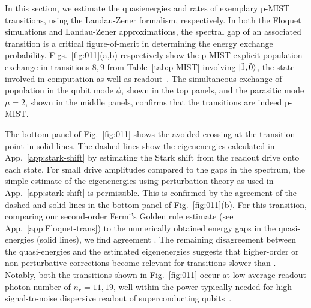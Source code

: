 \documentclass[%
reprint,
superscriptaddress,
 amsmath,amssymb,
 aps,
 prx,
longbibliography,
floatfix,
]{revtex4-2}
\newcommand{\singh}[1]{{\color{orange}{{}#1}}}%
\begin{document}
In this section, we estimate the quasienergies and rates of exemplary p-MIST transitions, using the Landau-Zener formalism, respectively. In both the Floquet simulations and Landau-Zener approximations, the spectral gap of an associated transition is a critical figure-of-merit in determining the \singh{adiabatic} energy exchange probability. Figs.~\ref{fig:011}(a,b) respectively show the p-MIST explicit population exchange in transitions $8,9$ from Table~\ref{tab:p-MIST} involving $\ket{\tilde{1},\tilde{0}}$, the state involved in computation as well as readout~\cite{zhang_universal_2021}. The simultaneous exchange of population in the qubit mode $\phi$, shown in the top panels, and the parasitic mode $\mu=2$, shown in the middle panels, confirms that the transitions are indeed p-MIST. 

The bottom panel of Fig.~\ref{fig:011} shows the avoided crossing at the transition point in solid lines. The dashed lines show the eigenenergies calculated in App.~\ref{app:stark-shift} by estimating the Stark shift from the readout drive onto each state. For small drive amplitudes compared to the gaps in the spectrum, the simple estimate of the eigenenergies using perturbation theory as used in App.~\ref{app:stark-shift} is permissible. This is confirmed by the agreement of the dashed and solid lines in the bottom panel of Fig.~\ref{fig:011}(b). For this transition, comparing our second-order Fermi's Golden rule estimate (see App.~\ref{app:Floquet-trans})  to the numerically obtained energy gaps in the quasi-energies (solid lines), we find agreement \singh{within $0.1 \ \mathrm{KHz}$}. The remaining disagreement between the quasi-energies and the estimated eigenenergies suggests that higher-order or non-perturbative corrections become relevant for transitions slower than \singh{$\Delta_{ac}=0.5 \ \mathrm{MHz}$}. Notably, both the transitions shown in Fig.~\ref{fig:011} occur at low average readout photon number of $\bar n_r=11,19$, well within the power typically needed for high signal-to-noise dispersive readout of superconducting qubits~\cite{gusenkova2021quantum}. 
\end{document}
